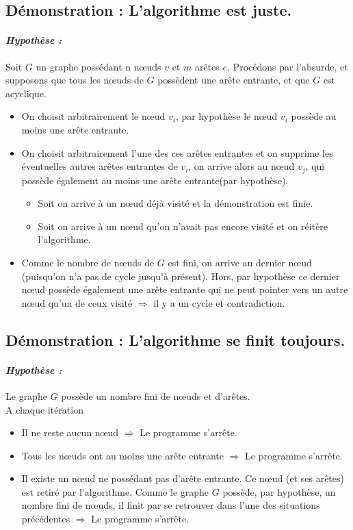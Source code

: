 \subsection*{Démonstration : L'algorithme est juste.}
\paragraph{\textit{Hypothèse :}}Soit $G$ un graphe possédant n nœuds $v$ et $m$ arêtes $e$. Procédons par l'absurde, et supposons que tous les nœuds de $G$ possèdent une arête entrante, et que $G$ est acyclique.\\

\begin{itemize}
\item On choisit arbitrairement le nœud $v_i$, par hypothèse le nœud $v_i$ possède au moins une arête entrante. 
\item On choisit arbitrairement l'une des ces arêtes entrantes et on supprime les éventuelles autres arêtes entrantes de $v_i$, on arrive alors au nœud $v_j$, qui possède également au moins une arête entrante(par hypothèse).
\begin{itemize}
\item Soit on arrive à un nœud déjà visité et la démonstration est finie.
\item Soit on arrive à un nœud qu'on n'avait pas encore visité et on réitère l'algorithme.
\end{itemize}
\item Comme le nombre de nœuds de $G$ est fini, on arrive au dernier nœud (puisqu'on n'a pas de cycle jusqu'à présent). Hors, par hypothèse ce dernier nœud possède également une arête entrante qui ne peut pointer vers un autre nœud qu'un de ceux visité $\Rightarrow$ il y a un cycle et contradiction.

\end{itemize}




\subsection*{Démonstration : L'algorithme se finit toujours.}
\paragraph{\textit{Hypothèse :}}Le graphe $G$ possède un nombre fini de nœuds et d'arêtes.\\

A chaque itération 
\begin{itemize}
\item Il ne reste aucun nœud $\Rightarrow$ Le programme s'arrête.
\item Tous les nœuds ont au moins une arête entrante $\Rightarrow$ Le programme s'arrête.
\item Il existe un nœud ne possédant pas d'arête entrante. Ce nœud (et ses arêtes) est retiré par l'algorithme. Comme le graphe $G$ possède, par hypothèse, un nombre fini de nœuds, il finit par se retrouver dans l'une des situations précédentes $\Rightarrow$ Le programme s'arrête.
\end{itemize} 
